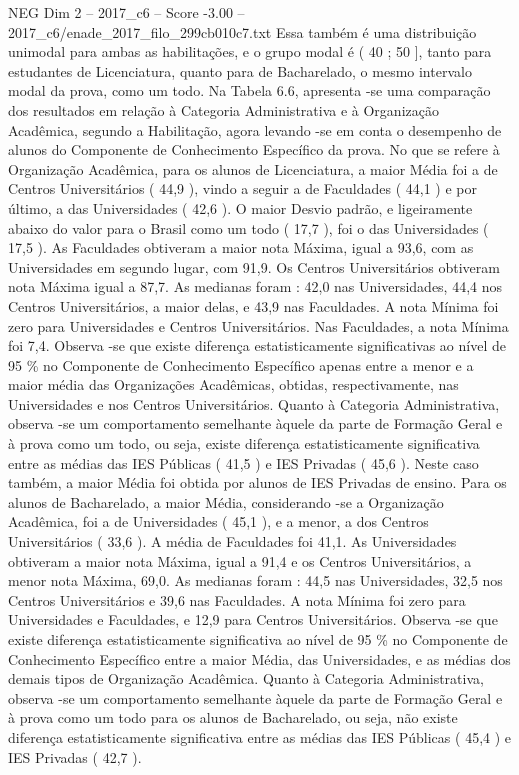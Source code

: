 \begin{textsample}{NEG Dim 2 – 2017\_c6 – Score -3.00 – 2017\_c6/enade\_2017\_filo\_299cb010c7.txt}
Essa também é uma distribuição unimodal para ambas as habilitações, e o grupo modal é ( 40 ; 50 ], tanto para estudantes de Licenciatura, quanto para de Bacharelado, o mesmo intervalo modal da prova, como um todo.
Na Tabela 6.6, apresenta -se uma comparação dos resultados em relação à Categoria Administrativa e à Organização Acadêmica, segundo a Habilitação, agora levando -se em conta o desempenho de alunos do Componente de Conhecimento Específico da prova.
No que se refere à Organização Acadêmica, para os alunos de Licenciatura, a maior Média foi a de Centros Universitários ( 44,9 ), vindo a seguir a de Faculdades ( 44,1 ) e por último, a das Universidades ( 42,6 ).
O maior Desvio padrão, e ligeiramente abaixo do valor para o Brasil como um todo ( 17,7 ), foi o das Universidades ( 17,5 ).
As Faculdades obtiveram a maior nota Máxima, igual a 93,6, com as Universidades em segundo lugar, com 91,9.
Os Centros Universitários obtiveram nota Máxima igual a 87,7.
As medianas foram : 42,0 nas Universidades, 44,4 nos Centros Universitários, a maior delas, e 43,9 nas Faculdades.
A nota Mínima foi zero para Universidades e Centros Universitários.
Nas Faculdades, a nota Mínima foi 7,4.
Observa -se que existe diferença estatisticamente significativas ao nível de 95 \% no Componente de Conhecimento Específico apenas entre a menor e a maior média das Organizações Acadêmicas, obtidas, respectivamente, nas Universidades e nos Centros Universitários.
Quanto à Categoria Administrativa, observa -se um comportamento semelhante àquele da parte de Formação Geral e à prova como um todo, ou seja, existe diferença estatisticamente significativa entre as médias das IES Públicas ( 41,5 ) e IES Privadas ( 45,6 ).
Neste caso também, a maior Média foi obtida por alunos de IES Privadas de ensino.
Para os alunos de Bacharelado, a maior Média, considerando -se a Organização Acadêmica, foi a de Universidades ( 45,1 ), e a menor, a dos Centros Universitários ( 33,6 ).
A média de Faculdades foi 41,1.
As Universidades obtiveram a maior nota Máxima, igual a 91,4 e os Centros Universitários, a menor nota Máxima, 69,0.
As medianas foram : 44,5 nas Universidades, 32,5 nos Centros Universitários e 39,6 nas Faculdades.
A nota Mínima foi zero para Universidades e Faculdades, e 12,9 para Centros Universitários.
Observa -se que existe diferença estatisticamente significativa ao nível de 95 \% no Componente de Conhecimento Específico entre a maior Média, das Universidades, e as médias dos demais tipos de Organização Acadêmica.
Quanto à Categoria Administrativa, observa -se um comportamento semelhante àquele da parte de Formação Geral e à prova como um todo para os alunos de Bacharelado, ou seja, não existe diferença estatisticamente significativa entre as médias das IES Públicas ( 45,4 ) e IES Privadas ( 42,7 ).

\end{textsample}
